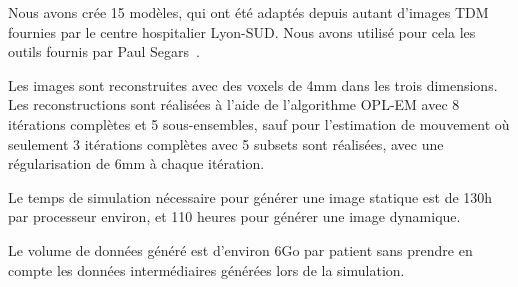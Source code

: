 Nous avons crée 15 modèles, qui ont été adaptés depuis autant d'images TDM fournies par le centre hospitalier Lyon-SUD. Nous avons utilisé pour cela les outils fournis par Paul Segars~\cite{segars2001These}.

Les images sont reconstruites avec des voxels de 4mm dans les trois dimensions. Les reconstructions sont réalisées à l'aide de l'algorithme OPL-EM avec 8 itérations complètes et 5 sous-ensembles, sauf pour l'estimation de mouvement où seulement 3 itérations complètes avec 5 subsets sont réalisées, avec une régularisation de 6mm à chaque itération. 

Le temps de simulation nécessaire pour générer une image statique est de 130h par processeur environ, et 110 heures pour générer une image dynamique.

Le volume de données généré est d'environ 6Go par patient sans prendre en compte les données intermédiaires générées lors de la simulation.

